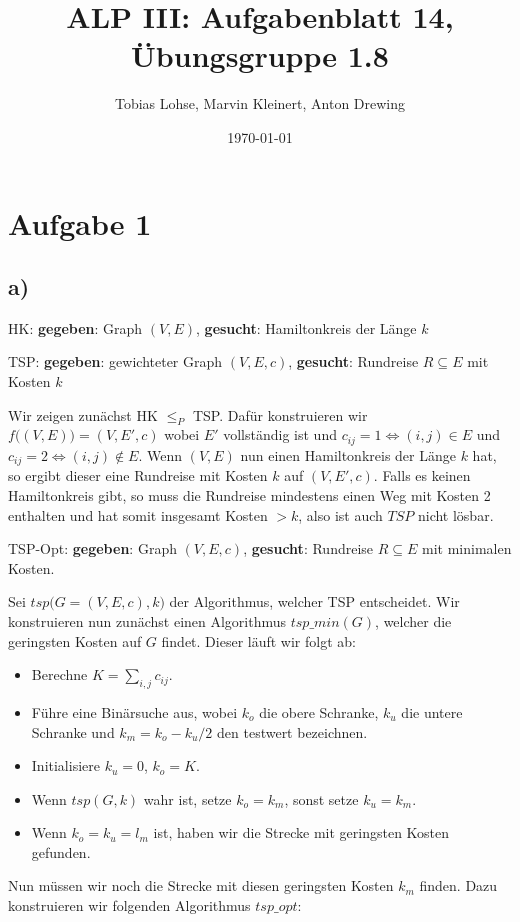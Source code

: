 \documentclass[a4paper,11pt]{article}
\title{\vspace{-1.5cm} ALP III: Aufgabenblatt 14, Übungsgruppe 1.8 }
\author {Tobias Lohse, Marvin Kleinert, Anton Drewing}
\date{\today}
\begin{document}
\maketitle

\section*{Aufgabe 1}

\subsection*{a)}
HK: \textbf{gegeben}: Graph $(V,E)$, \textbf{gesucht}: Hamiltonkreis der Länge $k$

TSP: \textbf{gegeben}: gewichteter Graph $(V,E,c)$, \textbf{gesucht}: Rundreise $R\subseteq E$ mit Kosten $k$

Wir zeigen zunächst HK $\leq_P$ TSP. Dafür konstruieren wir $f\big((V,E)\big) = (V,E',c)$ wobei $E'$ vollständig ist und $c_{ij} = 1 \Leftrightarrow (i,j)\in E$ und $c_{ij} = 2 \Leftrightarrow (i,j)\notin E$. Wenn $(V,E)$ nun einen Hamiltonkreis der Länge $k$ hat, so ergibt dieser eine Rundreise mit Kosten $k$ auf $(V,E',c)$. Falls es keinen Hamiltonkreis gibt, so muss die Rundreise mindestens einen Weg mit Kosten 2 enthalten und hat somit insgesamt Kosten $>k$, also ist auch $TSP$ nicht lösbar. 

TSP-Opt: \textbf{gegeben}: Graph $(V,E,c)$, \textbf{gesucht}: Rundreise $R\subseteq E$ mit minimalen Kosten. 

Sei $tsp\big(G=(V,E,c),k\big)$ der Algorithmus, welcher TSP entscheidet. Wir konstruieren nun zunächst einen Algorithmus $tsp\_min(G)$, welcher die geringsten Kosten auf $G$ findet. Dieser läuft wir folgt ab: 
\begin{itemize}
\item Berechne $K=\sum_{i,j} c_{ij}$.
\item Führe eine Binärsuche aus, wobei $k_o$ die obere Schranke, $k_u$ die untere Schranke und $k_m=k_o-k_u/2$ den testwert bezeichnen. 
\item Initialisiere $k_u=0$, $k_o=K$.
\item Wenn $tsp(G,k)$ wahr ist, setze $k_o=k_m$, sonst setze $k_u=k_m$.
\item Wenn $k_o=k_u=l_m$ ist, haben wir die Strecke mit geringsten Kosten gefunden.
\end{itemize}

Nun müssen wir noch die Strecke mit diesen geringsten Kosten $k_m$ finden. Dazu konstruieren wir folgenden Algorithmus $tsp\_opt$: 
\end{document}
